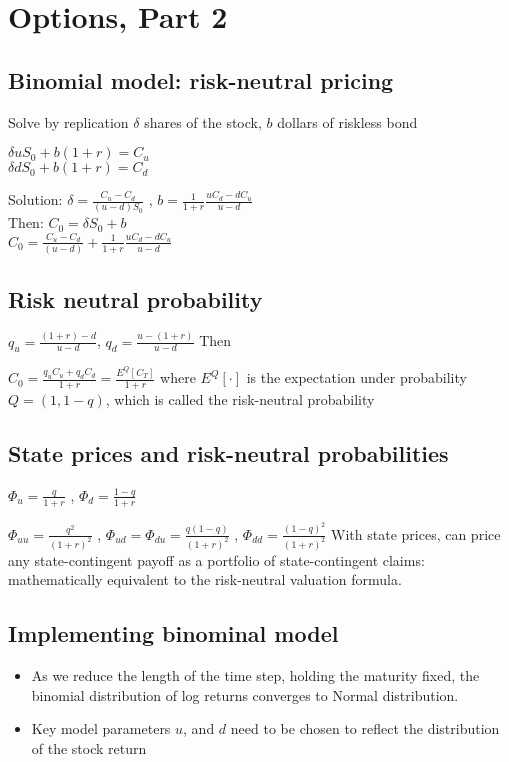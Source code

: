 \section{Options, Part 2}

\subsection*{Binomial model: risk-neutral pricing}


Solve by replication $\delta$ shares of the stock, $b$ dollars of riskless bond

$\delta u S_0 + b (1+r) = C_u$ \\
$\delta d S_0 + b (1+r) = C_d$

Solution: $\delta = \frac{C_u-C_d}{(u-d)S_0}$ , 
$b=\frac{1}{1+r}\frac{uC_d-dC_u}{u-d}$ \\
Then: $C_0 = \delta S_0 + b$ \\
$ C_0 = \frac{C_u-C_d}{(u-d)} + \frac{1}{1+r} \frac{uC_d-dC_u}{u-d}$ \\

\subsection*{Risk neutral probability}

$q_u=\frac{(1+r)-d}{u-d}$, $q_d = \frac{u-(1+r)}{u-d}$ Then

$C_0=\frac{q_u C_u + q_d C_d}{1+r} = \frac{E^Q[C_T]}{1+r}$ 
where $E^Q[\cdot]$ is the expectation under probability $Q=(1,1-q)$, which is
called the risk-neutral probability

\subsection*{State prices and risk-neutral probabilities}
$\Phi_u = \frac{q}{1+r}$ , $\Phi_d = \frac{1-q}{1+r}$

$\Phi_{uu} = \frac{q^2}{(1+r)^2}$ , $\Phi_{ud} = \Phi_{du} = \frac{q(1-q)}{(1+r)^2}$ , $\Phi_{dd} = \frac{(1-q)^2}{(1+r)^2}$
With state prices, can price any state-contingent payoff as a portfolio of
state-contingent claims: mathematically equivalent to the risk-neutral
valuation formula.


\subsection*{Implementing binominal model}

\begin{itemize}
	\item As we reduce the length of the time step, holding the maturity fixed, the
	binomial distribution of log returns converges to Normal distribution.
	\item Key model parameters $u$, and $d$ need to be chosen to reflect the
	distribution of the stock return
\end{itemize}

